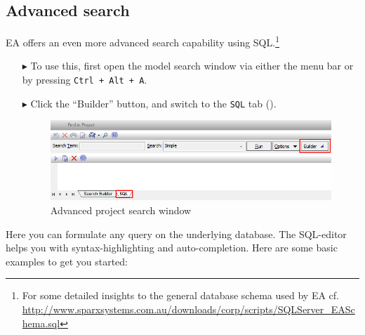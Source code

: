 \subsection{Advanced search}
\label{sect:appendix_adv_search}

EA offers an even more advanced search capability using SQL.\footnote{For some detailed insights to the general database schema used by EA cf. \\
\url{http://www.sparxsystems.com.au/downloads/corp/scripts/SQLServer_EASchema.sql}}

\begin{itemize}

\item[$\blacktriangleright$] To use this, first open the model search window via either the menu bar or by pressing \texttt{Ctrl + Alt + A}.

\item[$\blacktriangleright$] Click the ``Builder'' button, and switch to the \texttt{SQL} tab (). 

\begin{figure}[htbp]
\begin{center}
  \includegraphics[width=\textwidth]{ea_activateSQLSearch}
  \caption{Advanced project search window}  
  \label{ea:builderSQLtab}
\end{center}
\end{figure}

\end{itemize}

Here you can formulate any query on the underlying database. The SQL-editor helps you with syntax-highlighting and auto-completion. Here are some basic
examples to get you started:

